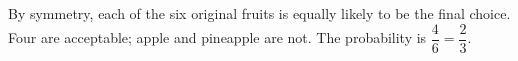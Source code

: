 By symmetry, each of the six original fruits is equally likely to be the final choice. Four are acceptable; apple and pineapple are not. The probability is $\dfrac{4}{6}=\boxed{\dfrac{2}{3}}$.
